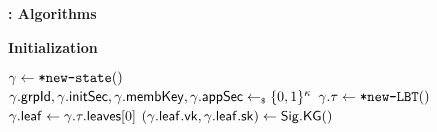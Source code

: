 

\begin{figure*}[!p]%
	\begin{anybox}{\sffamily\bfseries \saik : Algorithms}
			\begin{minipage}[t]{0.48\linewidth}
        {\bf Initialization}
        \begin{algorithmic}
          \If{$\id = \pgod$}
            \State $\gamma \gets {\ensuremath{\textnormal{\tt*new-state}}}()$
            \State $\gamma.{\mathsf{grpId}}, \gamma.{\mathsf{initSec}}, \gamma.{\mathsf{membKey}}, \gamma.{\mathsf{appSec}} \gets_{\scriptscriptstyle\$} \{0,1\}^\kappa$
            \State $\gamma.\tau \gets {\ensuremath{\textnormal{\tt*new-LBT}}}()$
            \State $\gamma.{\mathsf{leaf}} \gets \gamma.\tau.{\mathsf{leaves}}[0]$
            \State $(\gamma.{\mathsf{leaf}}.{\mathsf{vk}}, \gamma.{\mathsf{leaf}}.{\mathsf{sk}}) \gets {\ensuremath{\mathsf{Sig}}}.{\mathsf{KG}}()$
          \EndIf
        \end{algorithmic}


\end{minipage}
\end{anybox}
\end{figure*}
